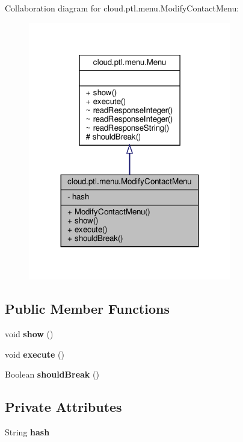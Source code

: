 Collaboration diagram for cloud.\+ptl.\+menu.\+Modify\+Contact\+Menu\+:
\nopagebreak
\begin{figure}[H]
\begin{center}
\leavevmode
\includegraphics[width=251pt]{classcloud_1_1ptl_1_1menu_1_1ModifyContactMenu__coll__graph}
\end{center}
\end{figure}
\subsection*{Public Member Functions}
\begin{DoxyCompactItemize}
\item 
\mbox{\label{classcloud_1_1ptl_1_1menu_1_1ModifyContactMenu_ad0d13c849aed2d47ad320847a768d0db}} 
void {\bfseries show} ()
\item 
\mbox{\label{classcloud_1_1ptl_1_1menu_1_1ModifyContactMenu_a9a1dc878f82cdfdac1badeabf6e5a8bc}} 
void {\bfseries execute} ()
\item 
\mbox{\label{classcloud_1_1ptl_1_1menu_1_1ModifyContactMenu_a12ab2eb24fa364668c4800bd0693f59b}} 
Boolean {\bfseries should\+Break} ()
\end{DoxyCompactItemize}
\subsection*{Private Attributes}
\begin{DoxyCompactItemize}
\item 
\mbox{\label{classcloud_1_1ptl_1_1menu_1_1ModifyContactMenu_a1b2c93a68eda3ac1500c91b0212fc042}} 
String {\bfseries hash}
\end{DoxyCompactItemize}

